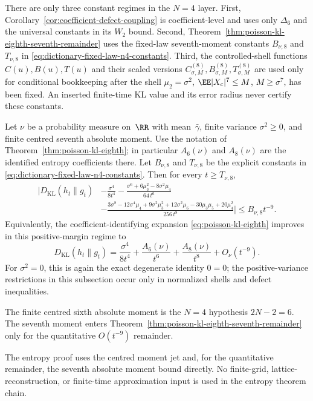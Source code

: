 There are only three constant regimes in the \(N=4\) layer.  First,
Corollary~\ref{cor:coefficient-defect-coupling} is coefficient-level and uses
only \(\Delta_6\) and the universal constants in its \(W_2\) bound.  Second,
Theorem~\ref{thm:poisson-kl-eighth-seventh-remainder} uses the fixed-law
seventh-moment constants \(B_{\nu,8}\) and \(T_{\nu,8}\) in
\eqref{eq:dictionary-fixed-law-n4-constants}.  Third, the controlled-shell
functions \(C(u),B(u),T(u)\) and their scaled versions
\(C_{\sigma,M}^{(8)},B_{\sigma,M}^{(8)},T_{\sigma,M}^{(8)}\) are used only
for conditional bookkeeping after the shell
\(\mu_2=\sigma^2\), \(\EE|X_c|^7\le M\), \(M\ge\sigma^7\), has been fixed.
An inserted finite-time KL value and its error radius never certify these
constants.

\begin{theorem}[Quantitative \(N=4\) remainder under the seventh moment]%
\label{thm:poisson-kl-eighth-seventh-remainder}
Let $\nu$ be a probability measure on~$\RR$ with mean~$\bar{\gamma}$,
finite variance $\sigma^2\ge0$, and finite centred seventh absolute moment.  Use the
notation of Theorem~\ref{thm:poisson-kl-eighth}; in particular
\(A_6(\nu)\) and \(A_8(\nu)\) are the identified entropy coefficients there.
Let \(B_{\nu,8}\) and \(T_{\nu,8}\) be the explicit constants in
\eqref{eq:dictionary-fixed-law-n4-constants}.  Then for every
\(t\ge T_{\nu,8}\),
\begin{equation}\label{eq:poisson-kl-eighth-remainder}
\begin{split}
\Bigg|D_{\mathrm{KL}}(h_t\|g_t)
&-\frac{\sigma^4}{8t^4}
-\frac{\sigma^6+6\mu_3^2-8\sigma^2\mu_4}{64\,t^6}
\\
&-\frac{3\sigma^8-12\sigma^4\mu_4+9\sigma^2\mu_3^2
+12\sigma^2\mu_6-30\mu_3\mu_5+20\mu_4^2}{256\,t^8}
\Bigg|
\le B_{\nu,8}t^{-9}.
\end{split}
\end{equation}
Equivalently, the coefficient-identifying expansion
\eqref{eq:poisson-kl-eighth} improves in this positive-margin regime to
\[
D_{\mathrm{KL}}(h_t\|g_t)
=\frac{\sigma^4}{8t^4}
+\frac{A_6(\nu)}{t^6}
+\frac{A_8(\nu)}{t^8}
+O_\nu(t^{-9}).
\]
For \(\sigma^2=0\), this is again the exact degenerate identity \(0=0\);
the positive-variance restrictions in this subsection occur only in
normalized shells and defect inequalities.
\end{theorem}

\begin{remark}
The finite centred sixth absolute moment is the \(N=4\) hypothesis
\(2N-2=6\).  The seventh moment enters
Theorem~\ref{thm:poisson-kl-eighth-seventh-remainder} only for the
quantitative \(O(t^{-9})\) remainder.

The entropy proof uses the centred moment jet and, for the quantitative
remainder, the seventh absolute moment bound directly.  No finite-grid,
lattice-reconstruction, or finite-time approximation input is used in the
entropy theorem chain.
\end{remark}

